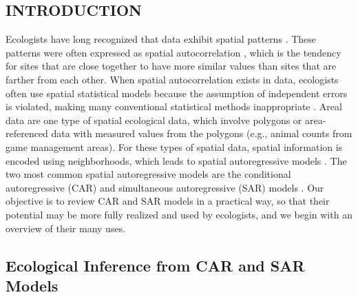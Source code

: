 \documentclass[11pt, titlepage]{article}\usepackage[]{graphicx}\usepackage[]{color}
\begin{document}

\newpage
\begin{spacing}{1.9}
\begin{flushleft}
\setlength{\parindent}{1cm}



\section*{INTRODUCTION}

Ecologists have long recognized that data exhibit spatial patterns \citep{Watt:patt:1947}. These patterns were often expressed as spatial autocorrelation \citep{Soka:Oden:spat:1978}, which is the tendency for sites that are close together to have more similar values than sites that are farther from each other.  When spatial autocorrelation exists in data, ecologists often use spatial statistical models because the assumption of independent errors is violated, making many conventional statistical methods inappropriate \citep{Clif:Ord:spat:1981,Lege:spat:1993}.   Areal data are one type of spatial ecological data, which involve polygons or area-referenced data with measured values from the polygons (e.g., animal counts from game management areas). For these types of spatial data, spatial information is encoded using neighborhoods, which leads to spatial autoregressive models \citep{Lich:Simo:Shri:Fran:spat:2002}. The two most common spatial autoregressive models are the conditional autoregressive (CAR) and simultaneous autoregressive (SAR) models \citep{Hain:spat:1990,Cres:stat:1993}. Our objective is to review CAR and SAR models in a practical way, so that their potential may be more fully realized and used by ecologists, and we begin with an overview of their many uses.

\subsection*{Ecological Inference from CAR and SAR Models}


\end{flushleft}
\end{spacing}
\end{document}
